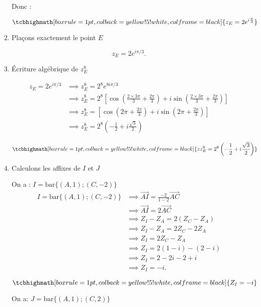 \documentclass[12pt,a4paper]{article}
\begin{document}
\begin{enumerate}
Donc :

\[
\tcbhighmath[boxrule=1pt, colback=yellow!5!white, colframe=black]{ z_E = 2 e^{i\frac{\pi}{3} }}
\]
\item Plaçons exactement le point $E$

\[
z_E = 2 e^{i\pi/3}.
\]

\item Écriture algébrique de $z_E^8$

\begin{align*}
z_E = 2 e^{i\pi/3} &\implies z_E^8 = 2^8 e^{8i\pi/3}\\
                   &\implies z_E^8=2^8 \left[\cos\left(\frac{2\times 3\pi}{3}+\frac{2\pi}{3}\right) + i\sin\left(\frac{2\times 3\pi}{3}+\frac{2\pi}{3}\right)\right]\\
										&\implies z_E^8=\left[\cos\left(2\pi+\frac{2\pi}{3}\right) + i\sin\left(2\pi+\frac{2\pi}{3}\right)\right]\\
										&\implies z_E^8 = 2^8 \left(-\frac{1}{2} + i\frac{\sqrt{3}}{2}\right)
\end{align*}

\[
\tcbhighmath[boxrule=1pt, colback=yellow!5!white, colframe=black]{ zz_E^8 = 2^8 \left(-\frac{1}{2} + i\frac{\sqrt{3}}{2}\right) }
\]
\item Calculons les affixes de $I$ et $J$

On a : $ I = \text{bar}\{(A,1); (C,-2)\} $
\begin{align*}
I = \text{bar}\{(A,1); (C,-2)\} &\implies \overrightarrow{AI} = \frac{-2}{1-2} \overrightarrow{AC}\\
                                &\implies \overrightarrow{AI} = 2 \overrightarrow{AC}\\
                                &\implies Z_I - Z_A = 2 (Z_C - Z_A)\\
                                &\implies Z_I - Z_A = 2Z_C - 2Z_A\\
                                &\implies Z_I = 2Z_C - Z_A\\
                                &\implies Z_I = 2 (1 - i) - (2 - i)\\
                                &\implies Z_I = 2 - 2i - 2 + i\\
                                &\implies Z_I = -i.
\end{align*}

\[
\tcbhighmath[boxrule=1pt, colback=yellow!5!white, colframe=black]{ Z_I = -i }
\]


On a: $ J = \text{bar}\{(A,1); (C,2)\} $


\end{enumerate}
\end{document}
